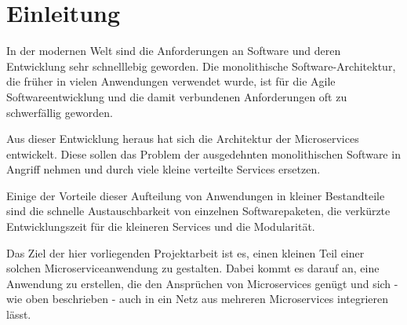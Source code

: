 
\chapter{Einleitung}
\label{ch:Einleitung}
In der modernen Welt sind die Anforderungen an Software und deren Entwicklung sehr schnelllebig geworden. Die monolithische Software-Architektur, die früher in vielen Anwendungen verwendet wurde, ist für die Agile Softwareentwicklung und die damit verbundenen Anforderungen oft zu schwerfällig geworden.

Aus dieser Entwicklung heraus hat sich die Architektur der \glqq Microservices\grqq{} entwickelt. Diese sollen das Problem der ausgedehnten monolithischen Software in Angriff nehmen und durch viele kleine  verteilte Services ersetzen.

Einige der Vorteile dieser Aufteilung von Anwendungen in kleiner Bestandteile sind die schnelle Austauschbarkeit von einzelnen Softwarepaketen, die verkürzte Entwicklungszeit für die kleineren Services und die Modularität.

Das Ziel der hier vorliegenden Projektarbeit ist es, einen kleinen Teil einer solchen Microserviceanwendung zu gestalten. Dabei kommt es darauf an, eine Anwendung zu erstellen, die den Ansprüchen von Microservices genügt und sich - wie oben beschrieben - auch in ein Netz aus mehreren Microservices integrieren lässt.
